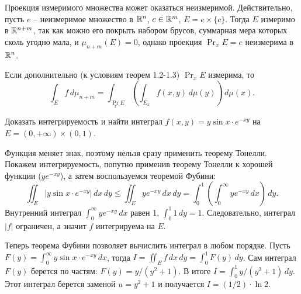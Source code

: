 \begin{note}
	Проекция измеримого множества может оказаться неизмеримой. Действительно, пусть $e$ -- неизмеримое множество в $\mathbb{R}^n$, $c \in \mathbb{R}^m$, $E = e \times \{c\}$. 
	Тогда $E$ измеримо в $\mathbb{R}^{n+m}$, так как можно его покрыть набором брусов, суммарная мера которых сколь угодно мала, и $\mu_{n+m}(E) = 0$, однако проекция $\operatorname{Pr}_x E = e$ неизмерима в $\mathbb{R}^n$.
\end{note}

\begin{corollary}
	Если дополнительно (к условиям теорем 1.2-1.3) $\operatorname{Pr}_x E$ измерима, то 
	\[ \int_{E} f \, d\mu_{n+m} = \int_{\operatorname{Pr}_x E} \left( \int_{E_x} f(x, y) \, d\mu(y) \right) \, d\mu(x). \]
\end{corollary}

\begin{example}
	Доказать интегрируемость и найти интеграл $f(x, y) = y \sin x \cdot e^{-xy}$ на $E = (0, +\infty) \times (0, 1)$.
\end{example}

\begin{myproof}
	Функция меняет знак, поэтому нельзя сразу применить теорему Тонелли. Покажем интегрируемость, попутно применив теорему Тонелли к хорошей функции ($ye^{-xy}$), а затем воспользуемся теоремой Фубини:
    \[ \iint_{E} |y \sin x \cdot e^{-xy}| \, dx \, dy \leq \iint_{E} y e^{-xy} \, dx \, dy = \int_0^1 \left( \int_0^{\infty} y e^{-xy} \, dx \right) \, dy. \]
    Внутренний интеграл $\int_{0}^{\infty} ye^{-xy} \, dx$ равен 1, $\int_0^1 1 \, dy = 1$. Следовательно, интеграл $|f|$ ограничен, а значит $f$ интегрируема на $E$.
    
    \vspace{5pt}
    Теперь теорема Фубини позволяет вычислить интеграл в любом порядке. 
    Пусть $F(y) = \int_{0}^{\infty} y \sin x \cdot e^{-xy} \, dx$, тогда $I = \iint_E f \, dx \, dy = \int_0^1 F(y) \, dy$.
    Сам интеграл $F(y)$ берется по частям: $F(y) = y / (y^2 + 1)$. 
    В итоге $I = \int_0^1 y/(y^2+1) \, dy$. Этот интеграл берется заменой $u = y^2+1$ и получается $I = (1/2) \cdot \ln 2$.
\end{myproof}